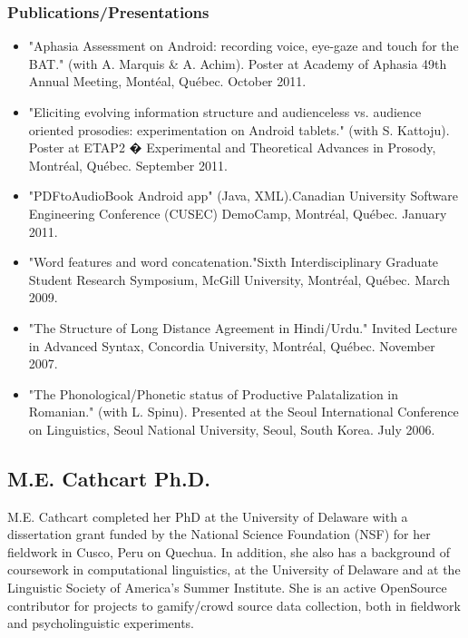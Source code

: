 \documentclass[12 pt]{article}
\begin{document}
\subsubsection{Publications/Presentations}
\begin{itemize}

\item "Aphasia Assessment on Android: recording voice, eye-gaze and touch for the BAT." (with A. Marquis \& A. Achim). Poster at Academy of Aphasia 49th Annual Meeting, Mont\'eal, Qu\'ebec. October 2011.
\item "Eliciting evolving information structure and audienceless vs. audience oriented prosodies: experimentation on Android tablets." (with S. Kattoju). Poster at ETAP2 � Experimental and Theoretical Advances in Prosody, Montr\'eal, Qu\'ebec. September 2011.
\item "PDFtoAudioBook Android app" (Java, XML).Canadian University Software Engineering Conference (CUSEC) DemoCamp, Montr\'eal, Qu\'ebec. January 2011.
\item "Word features and word concatenation."Sixth Interdisciplinary Graduate Student Research Symposium, McGill University, Montr\'eal, Qu\'ebec. March 2009.
\item "The Structure of Long Distance Agreement in Hindi/Urdu." Invited Lecture in Advanced Syntax, Concordia University, Montr\'eal, Qu\'ebec. November 2007.
\item "The Phonological/Phonetic status of Productive Palatalization in Romanian." (with L. Spinu). Presented at the Seoul International Conference on Linguistics, Seoul National University, Seoul, South Korea. July 2006.
\end{itemize}



\subsection{M.E. Cathcart Ph.D.}

M.E. Cathcart completed her PhD at the University of Delaware with a dissertation grant funded by the National Science Foundation (NSF) for her fieldwork in Cusco, Peru on Quechua. In addition, she also has a background of coursework in computational linguistics, at the University of Delaware and at the Linguistic Society of America's Summer Institute. She is an active OpenSource contributor for projects to gamify/crowd source data collection, both in fieldwork and psycholinguistic experiments.
\end{document}
